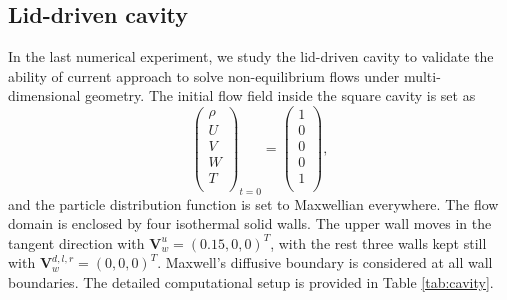 \documentclass[preprint,3p,12pt,sort&compress]{elsarticle}
\begin{document}
\subsection{Lid-driven cavity}

In the last numerical experiment, we study the lid-driven cavity to validate the ability of current approach to solve non-equilibrium flows under multi-dimensional geometry. 
The initial flow field inside the square cavity is set as
\begin{equation*}
    \left(\begin{array}{c}
    \rho \\
    U \\
    V \\
    W \\
    T \\
    \end{array}\right)_{{t=0}}=\left(\begin{array}{c}
    1 \\
    0 \\
    0 \\
    0 \\
    1 \\
    \end{array}\right),
\end{equation*}
and the particle distribution function is set to Maxwellian everywhere.
The flow domain is enclosed by four isothermal solid walls.
The upper wall moves in the tangent direction with $\mathbf V_w^u = (0.15, 0, 0)^T$, with the rest three walls kept still with $\mathbf V_w^{d,l,r} = (0, 0, 0)^T$.
Maxwell’s diffusive boundary is considered at all wall boundaries.
The detailed computational setup is provided in Table \ref{tab:cavity}.
\end{document}
